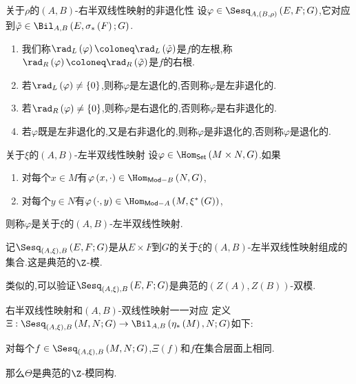 \begin{definition}{关于$\rho$的$\left(A,B\right)$-右半双线性映射的非退化性}{}
	设$\varphi\in\Sesq_{A,(B,\rho)}\left(E,F;G\right)$,它对应到$\tilde{\varphi}\in\Bil_{A,B}\left(E,\sigma_{\ast}\left(F\right);G\right)$.
	\begin{enumerate}
		\item 我们称$\rad_{L}\left(\varphi\right)\coloneq\rad_{L}\left(\tilde{\varphi}\right)$是$f$的左根,称$\rad_{R}\left(\varphi\right)\coloneq\rad_{R}\left(\tilde{\varphi}\right)$是$f$的右根.
		\item 若$\rad_{L}\left(\varphi\right)\neq\left\{0\right\}$,则称$\varphi$是左退化的,否则称$\varphi$是左非退化的.
		\item 若$\rad_{R}\left(\varphi\right)\neq\left\{0\right\}$,则称$\varphi$是右退化的,否则称$\varphi$是右非退化的.
		\item 若$\varphi$既是左非退化的,又是右非退化的,则称$\varphi$是非退化的,否则称$\varphi$是退化的.
	\end{enumerate}
\end{definition}

\begin{definition}{关于$\xi$的$\left(A,B\right)$-左半双线性映射}{}
	设$\varphi\in\Hom_{\mathsf{Set}}\left(M\times N,G\right)$.如果
	\begin{enumerate}
		\item 对每个$x\in M$有$\varphi\left(x,\cdot\right)\in\Hom_{\mathsf{Mod}-B}\left(N,G\right)$,
		\item 对每个$y\in N$有$\varphi\left(\cdot,y\right)\in\Hom_{\mathsf{Mod}-A}\left(M,\xi^{\ast}\left(G\right)\right)$,
	\end{enumerate}
	则称$\varphi$是关于$\xi$的$\left(A,B\right)$-左半双线性映射.
\end{definition}

\begin{definition}{}{}
	记$\Sesq_{(A,\xi),B}\left(E,F;G\right)$是从$E\times F$到$G$的关于$\xi$的$\left(A,B\right)$-左半双线性映射组成的集合.这是典范的$\Z$-模.
\end{definition}

\begin{remark}{}{}
	类似的,可以验证$\Sesq_{(A,\xi),B}\left(E,F;G\right)$是典范的$\left(Z\left(A\right),Z\left(B\right)\right)$-双模.
\end{remark}

\begin{proposition}{右半双线性映射和$\left(A,B\right)$-双线性映射一一对应}{}
	定义$\Xi:\Sesq_{(A,\xi),B}\left(M,N;G\right)\to\Bil_{A,B}\left(\eta_{\ast}\left(M\right),N;G\right)$如下:
	\begin{center}
		对每个$f\in\Sesq_{(A,\xi),B}\left(M,N;G\right)$,$\Xi\left(f\right)$和$f$在集合层面上相同.
	\end{center}
	那么$\Theta$是典范的$\Z$-模同构.
\end{proposition}

